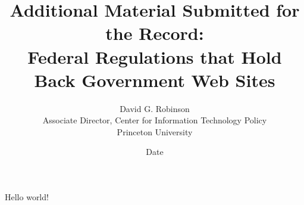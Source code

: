 \documentclass{article}
\title{Additional Material Submitted for the Record: \\
Federal Regulations that Hold Back Government Web Sites}
\author{David G. Robinson\\
Associate Director, Center for Information Technology Policy\\
Princeton University}
\date{Date}
\begin{document}
   \maketitle
   Hello world! \cite{judging_forgeries}


\end{document}
